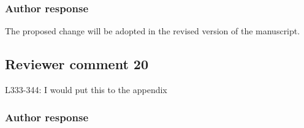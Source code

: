 \documentclass[11pt]{scrartcl}
\begin{document}
\subsubsection*{Author response}

The proposed change will be adopted in the revised version of the manuscript.

%
%
%


\subsection*{Reviewer comment 20}
L333-344: I would put this to the appendix

\subsubsection*{Author response}
\end{document}
